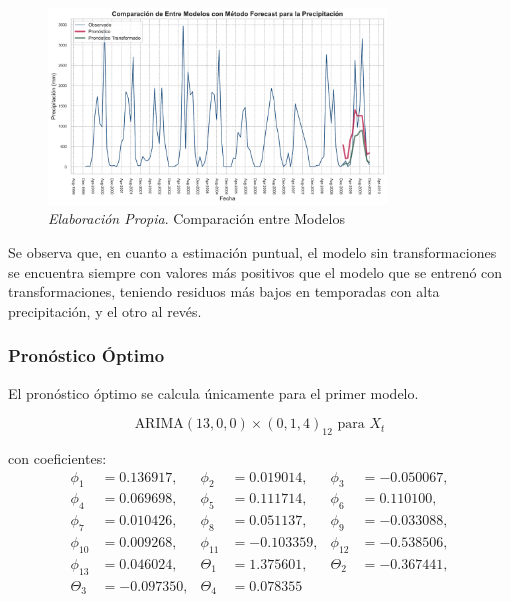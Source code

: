 \documentclass[12pt,letterpaper]{article}   %
\begin{document}
\begin{figure}[ht]
    \centering
    \includegraphics[width=0.8\textwidth]{imagenes/05-04-metodo-forecast-comparacion.pdf}
    \caption{\textit{Elaboración Propia}. Comparación entre Modelos}
\end{figure}

Se observa que, en cuanto a estimación puntual, el modelo sin transformaciones se encuentra siempre con valores más positivos que el modelo que se entrenó con transformaciones, teniendo residuos más bajos en temporadas con alta precipitación, y el otro al revés.

















\newpage
  \subsubsection{Pronóstico Óptimo}

El pronóstico óptimo se calcula únicamente para el primer modelo.

\[
\text{ARIMA}(13,0,0) \times (0,1,4)_{12} \text{ para } X_t
\]

con coeficientes:
\vspace{-10pt}
\begin{align*}
\phi_1 &= 0.136917, & \phi_2 &= 0.019014, & \phi_3 &= -0.050067, \\
\phi_4 &= 0.069698, & \phi_5 &= 0.111714, & \phi_6 &= 0.110100, \\
\phi_7 &= 0.010426, & \phi_8 &= 0.051137, & \phi_9 &= -0.033088, \\
\phi_{10} &= 0.009268, & \phi_{11} &= -0.103359, & \phi_{12} &= -0.538506, \\
\phi_{13} &= 0.046024, & \Theta_1 &= 1.375601, & \Theta_2 &= -0.367441, \\
\Theta_3 &= -0.097350, & \Theta_4 &= 0.078355
\end{align*}
\end{document}
